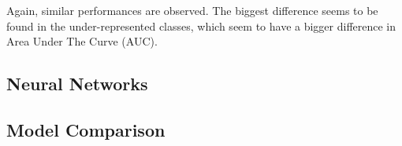 Again, similar performances are observed. The biggest difference
seems to be found in the under-represented classes, which seem to
have a bigger difference in Area Under The Curve (AUC).

\subsection{Neural Networks}


\subsection{Model Comparison}